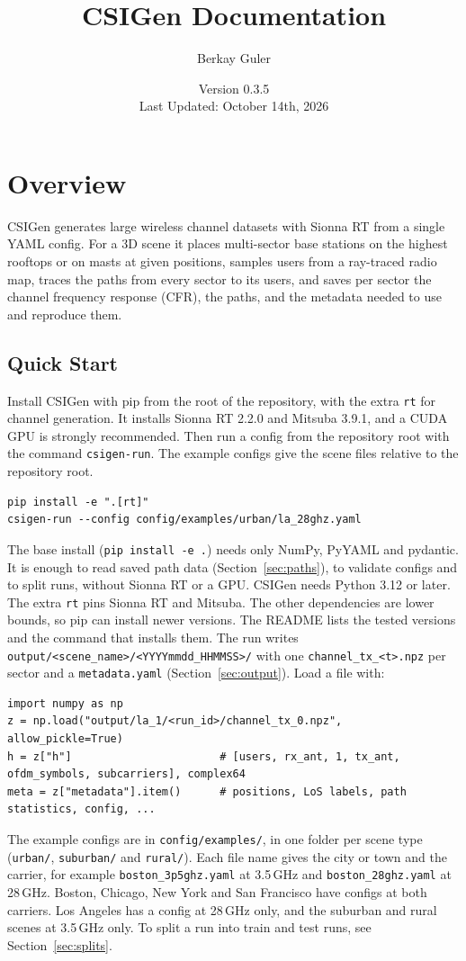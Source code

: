 \documentclass{article}
\title{CSIGen Documentation}
\author{Berkay Guler}
\date{Version 0.3.5 \\ Last Updated: October 14th, 2026}
\begin{document}
\sloppy

\maketitle
\tableofcontents
\clearpage

\section{Overview}
CSIGen generates large wireless channel datasets with Sionna RT from a single YAML config. For a 3D scene it places multi-sector base stations on the highest rooftops or on masts at given positions, samples users from a ray-traced radio map, traces the paths from every sector to its users, and saves per sector the channel frequency response (CFR), the paths, and the metadata needed to use and reproduce them.

\subsection{Quick Start}
Install CSIGen with pip from the root of the repository, with the extra \texttt{rt} for channel generation. It installs Sionna RT 2.2.0 and Mitsuba 3.9.1, and a CUDA GPU is strongly recommended. Then run a config from the repository root with the command \texttt{csigen-run}. The example configs give the scene files relative to the repository root.
\begin{verbatim}
pip install -e ".[rt]"
csigen-run --config config/examples/urban/la_28ghz.yaml
\end{verbatim}
The base install (\texttt{pip install -e .}) needs only NumPy, PyYAML and pydantic. It is enough to read saved path data (Section~\ref{sec:paths}), to validate configs and to split runs, without Sionna RT or a GPU. CSIGen needs Python 3.12 or later. The extra \texttt{rt} pins Sionna RT and Mitsuba. The other dependencies are lower bounds, so pip can install newer versions. The README lists the tested versions and the command that installs them.
The run writes \texttt{output/<scene\_name>/<YYYYmmdd\_HHMMSS>/} with one \texttt{channel\_tx\_<t>.npz} per sector and a \texttt{metadata.yaml} (Section~\ref{sec:output}). Load a file with:
\begin{verbatim}
import numpy as np
z = np.load("output/la_1/<run_id>/channel_tx_0.npz", allow_pickle=True)
h = z["h"]                       # [users, rx_ant, 1, tx_ant, ofdm_symbols, subcarriers], complex64
meta = z["metadata"].item()      # positions, LoS labels, path statistics, config, ...
\end{verbatim}
The example configs are in \texttt{config/examples/}, in one folder per scene type (\texttt{urban/}, \texttt{suburban/} and \texttt{rural/}). Each file name gives the city or town and the carrier, for example \texttt{boston\_3p5ghz.yaml} at 3.5\,GHz and \texttt{boston\_28ghz.yaml} at 28\,GHz. Boston, Chicago, New York and San Francisco have configs at both carriers. Los Angeles has a config at 28\,GHz only, and the suburban and rural scenes at 3.5\,GHz only. To split a run into train and test runs, see Section~\ref{sec:splits}.
\end{document}
